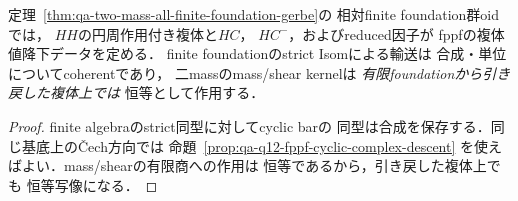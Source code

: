 \begin{corollary}
\label{cor:qa-q12-finite-foundation-cyclic-complex-descent}
定理~\ref{thm:qa-two-mass-all-finite-foundation-gerbe}の
相対finite foundation群oidでは，
$HH$の円周作用付き複体と$HC$，
$HC^-$，およびreduced因子が
fppfの複体値降下データを定める．
finite foundationのstrict Isomによる輸送は
合成・単位についてcoherentであり，
二massのmass/shear kernelは
\emph{有限foundationから引き戻した複体上では}
恒等として作用する．
\end{corollary}
\begin{proof}
finite algebraのstrict同型に対してcyclic barの
同型は合成を保存する．同じ基底上のČech方向では
命題~\ref{prop:qa-q12-fppf-cyclic-complex-descent}
を使えばよい．mass/shearの有限商への作用は
恒等であるから，引き戻した複体上でも
恒等写像になる．
\end{proof}

